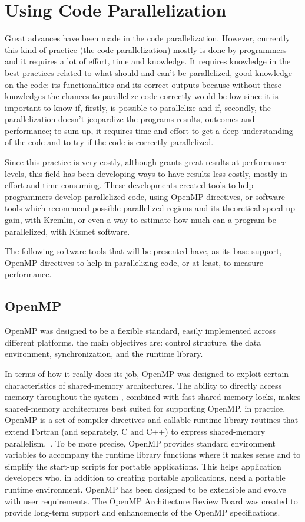 \section{Using Code Parallelization}\label{sec:codeparallelization}
Great advances have been made in the code parallelization. However, currently this kind of practice (the code parallelization) mostly is done by programmers and it requires a lot of effort, time and knowledge. It requires knowledge in the best practices related to what should and can't be parallelized, good knowledge on the code: its functionalities and its correct outputs because without these knowledges the chances to parallelize code correctly would be low since it is important to know if, firstly, is possible to parallelize and if, secondly, the parallelization doesn't jeopardize the programs results, outcomes and performance; to sum up, it requires time and effort to get a deep understanding of the code and to try if the code is correctly parallelized.~\cite{Jeon}

Since this practice is very costly, although grants great results at performance levels, this field has been developing ways to have results less costly, mostly in effort and time-consuming. These developments created tools to help programmers develop parallelized code, using OpenMP directives, or software tools which recommend possible parallelized regions and its theoretical speed up gain, with Kremlin, or even a way to estimate how much can a program be parallelized, with Kismet software.~\cite{Saturnino}

The following software tools that will be presented have, as its base support, OpenMP directives to help in parallelizing code, or at least, to measure performance.

\subsection{OpenMP}
OpenMP was designed to be a flexible standard, easily implemented across different platforms. the main objectives are: control structure, the data environment, synchronization, and the runtime library. 

In terms of how it really does its job, OpenMP was designed to exploit certain characteristics of shared-memory architectures. The ability to directly access memory throughout the system , combined with fast shared memory locks, makes shared-memory architectures best suited for supporting OpenMP. in practice, OpenMP is a set of compiler directives and callable runtime library routines that extend Fortran (and separately, C and C++) to express shared-memory parallelism.~\cite{Nc1998}. To be more precise, OpenMP provides standard environment variables to accompany the runtime library functions where it makes sense and to simplify  the start-up scripts for portable applications. This helps application developers who, in addition to creating portable applications, need a portable runtime environment. OpenMP has been designed to be extensible and evolve with user requirements. The OpenMP Architecture Review Board was created to provide long-term support and enhancements of the OpenMP specifications. 

